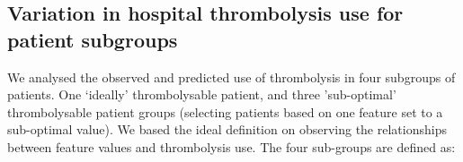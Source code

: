 



\subsection{Variation in hospital thrombolysis use for patient subgroups}

\iffalse
We analysed the observed and predicted use of thrombolysis in four subgroups of patients. One `ideally' thrombolysable patient, and three 'sub-optimal' thrombolysable patient groups (selecting patients based on one feature set to a sub-optimal value). We based the ideal definition on observing the relationships between feature values and thrombolysis use. The four sub-groups are defined as:

